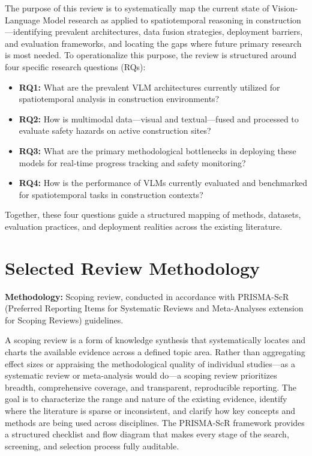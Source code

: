 \documentclass[11pt, letterpaper]{article}
\begin{document}
The purpose of this review is to systematically map the current state of
Vision-Language Model research as applied to spatiotemporal reasoning in
construction---identifying prevalent architectures, data fusion strategies,
deployment barriers, and evaluation frameworks, and locating the gaps where
future primary research is most needed. To operationalize this purpose, the
review is structured around four specific research questions (RQs):

\begin{itemize}[leftmargin=0.75in, label={}]
  \item \textbf{RQ1:} What are the prevalent VLM architectures currently
        utilized for spatiotemporal analysis in construction environments?
  \item \textbf{RQ2:} How is multimodal data---visual and textual---fused and
        processed to evaluate safety hazards on active construction sites?
  \item \textbf{RQ3:} What are the primary methodological bottlenecks in
        deploying these models for real-time progress tracking and safety
        monitoring?
  \item \textbf{RQ4:} How is the performance of VLMs currently evaluated and
        benchmarked for spatiotemporal tasks in construction contexts?
\end{itemize}

\noindent Together, these four questions guide a structured mapping of methods,
datasets, evaluation practices, and deployment realities across the existing
literature.

\section{Selected Review Methodology}

\noindent\textbf{Methodology:} Scoping review, conducted in accordance with
PRISMA-ScR (Preferred Reporting Items for Systematic Reviews and
Meta-Analyses extension for Scoping Reviews) guidelines.

A scoping review is a form of knowledge synthesis that systematically locates
and charts the available evidence across a defined topic area. Rather than
aggregating effect sizes or appraising the methodological quality of individual
studies---as a systematic review or meta-analysis would do---a scoping review
prioritizes breadth, comprehensive coverage, and transparent, reproducible
reporting. The goal is to characterize the range and nature of the existing
evidence, identify where the literature is sparse or inconsistent, and clarify
how key concepts and methods are being used across disciplines. The PRISMA-ScR
framework provides a structured checklist and flow diagram that makes every
stage of the search, screening, and selection process fully auditable.
\end{document}
